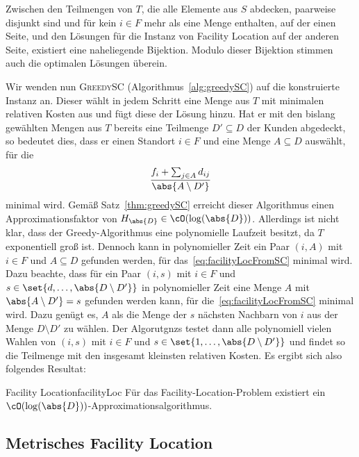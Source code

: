 \documentclass[language=ngerman,algolist]{TemplateLecture}
\begin{document}
Zwischen den Teilmengen von $T$, die alle Elemente aus $S$ abdecken, paarweise disjunkt sind und für kein $i \in F$ mehr als eine Menge enthalten, auf der einen Seite, und den Lösungen für die Instanz von Facility Location auf der anderen Seite, existiert eine naheliegende Bijektion. Modulo dieser Bijektion stimmen auch die optimalen Lösungen überein.

Wir wenden nun \textsc{GreedySC} (Algorithmus~\ref{alg:greedySC}) auf die konstruierte Instanz an. Dieser wählt in jedem Schritt eine Menge aus $T$ mit minimalen relativen Kosten aus und fügt diese der Lösung hinzu. Hat er mit den bislang gewählten Mengen aus $T$ bereits eine Teilmenge $D' \subseteq D$ der Kunden abgedeckt, so bedeutet dies, dass er einen Standort $i \in F$ und eine Menge $A \subseteq D$ auswählt, für die 
\begin{equation}
    \frac{f_i + \sum_{j \in A} d_{ij}}{\abs{A \setminus D'}} \label{eq:facilityLocFromSC}
\end{equation}
minimal wird. Gemäß Satz~\ref{thm:greedySC} erreicht dieser Algorithmus einen Approximationsfaktor von $H_{\abs{D}} \in \cO(\log(\abs{D}))$. Allerdings ist nicht klar, dass der Greedy-Algorithmus eine polynomielle Laufzeit besitzt, da $T$ exponentiell groß ist. Dennoch kann in polynomieller Zeit ein Paar $(i,A)$ mit $i \in F$ und $A \subseteq D$ gefunden werden, für das~\eqref{eq:facilityLocFromSC} minimal wird. Dazu beachte, dass für ein Paar $(i, s)$ mit $i \in F$ und $s \in \set{d, \ldots, \abs{D \setminus D'}}$ in polynomieller Zeit eine Menge $A$ mit $\abs{A \setminus D'} = s$ gefunden werden kann, für die~\eqref{eq:facilityLocFromSC} minimal wird. Dazu genügt es, $A$ als die Menge der $s$ nächsten Nachbarn von $i$ aus der Menge $D \setminus D'$ zu wählen. Der Algorutgnzs testet dann alle polynomiell vielen Wahlen von $(i, s)$ mit $i \in F$ und $s \in \set{1,\ldots,\abs{D \setminus D'}}$ und findet so die Teilmenge mit den insgesamt kleinsten relativen Kosten. Es ergibt sich also folgendes Resultat:

\begin{thm}{Facility Location}{facilityLoc}
    Für das Facility-Location-Problem existiert ein $\cO(\log(\abs{D}))$-Approximationsalgorithmus.
\end{thm}

\subsection{Metrisches Facility Location}
\end{document}
